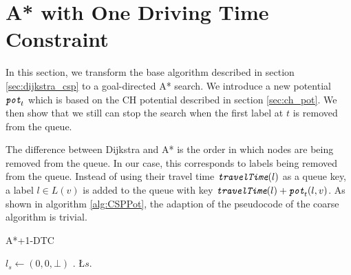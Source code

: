 \section{A* with One Driving Time Constraint}
In this section, we transform the base algorithm described in section \ref{sec:dijkstra_csp} to a goal-directed A* search. We introduce a new potential $\texttt{\itshape pot}_t$ which is based on the CH potential described in section \ref{sec:ch_pot}. We then show that we still can stop the search when the first label at $t$ is removed from the queue.

The difference between Dijkstra and A* is the order in which nodes are being removed from the queue. In our case, this corresponds to labels being removed from the queue. Instead of using their travel time $\texttt{\itshape travelTime}(l)$ as a queue key, a label $l \in L(v)$ is added to the queue with key $\texttt{\itshape travelTime}(l) + \texttt{\itshape pot}_t(l,v)$. As shown in algorithm \ref{alg:CSPPot}, the adaption of the pseudocode of the coarse algorithm is trivial.

\begin{algorithm}[bt]
	\caption{\textsc{A*+1-DTC}}\label{alg:CSPPot}

	\DontPrintSemicolon %



	\BlankLine
	$l_s \leftarrow (0,0,\bot)$\;
	\Q.\;
	\L{$s$}.\;
	\BlankLine
	{
		\settleNextNode{}\;

		{
			\Return\;
		}
	}
\end{algorithm}

